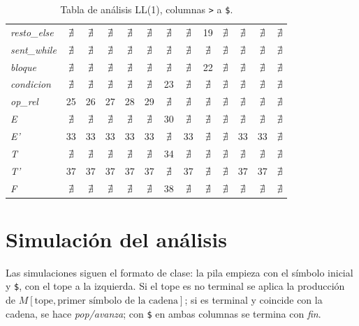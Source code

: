 \documentclass[12pt]{article}
\newcommand{\cmd}[1]{\texttt{\small #1}}
\newcommand{\nt}[1]{\textit{#1}}
\begin{document}
\begin{table}[p]
\begin{tabular}{@{}l*{12}{c}@{}}
\nt{resto\_else} & $\nexists$ & $\nexists$ & $\nexists$ & $\nexists$ & $\nexists$ & $\nexists$ & $\nexists$ & 19 & $\nexists$ & $\nexists$ & $\nexists$ & $\nexists$ \\
\nt{sent\_while} & $\nexists$ & $\nexists$ & $\nexists$ & $\nexists$ & $\nexists$ & $\nexists$ & $\nexists$ & $\nexists$ & $\nexists$ & $\nexists$ & $\nexists$ & $\nexists$ \\
\nt{bloque} & $\nexists$ & $\nexists$ & $\nexists$ & $\nexists$ & $\nexists$ & $\nexists$ & $\nexists$ & 22 & $\nexists$ & $\nexists$ & $\nexists$ & $\nexists$ \\
\nt{condicion} & $\nexists$ & $\nexists$ & $\nexists$ & $\nexists$ & $\nexists$ & 23 & $\nexists$ & $\nexists$ & $\nexists$ & $\nexists$ & $\nexists$ & $\nexists$ \\
\nt{op\_rel} & 25 & 26 & 27 & 28 & 29 & $\nexists$ & $\nexists$ & $\nexists$ & $\nexists$ & $\nexists$ & $\nexists$ & $\nexists$ \\
\nt{E} & $\nexists$ & $\nexists$ & $\nexists$ & $\nexists$ & $\nexists$ & 30 & $\nexists$ & $\nexists$ & $\nexists$ & $\nexists$ & $\nexists$ & $\nexists$ \\
\nt{E'} & 33 & 33 & 33 & 33 & 33 & $\nexists$ & 33 & $\nexists$ & $\nexists$ & 33 & 33 & $\nexists$ \\
\nt{T} & $\nexists$ & $\nexists$ & $\nexists$ & $\nexists$ & $\nexists$ & 34 & $\nexists$ & $\nexists$ & $\nexists$ & $\nexists$ & $\nexists$ & $\nexists$ \\
\nt{T'} & 37 & 37 & 37 & 37 & 37 & $\nexists$ & 37 & $\nexists$ & $\nexists$ & 37 & 37 & $\nexists$ \\
\nt{F} & $\nexists$ & $\nexists$ & $\nexists$ & $\nexists$ & $\nexists$ & 38 & $\nexists$ & $\nexists$ & $\nexists$ & $\nexists$ & $\nexists$ & $\nexists$ \\
\bottomrule
\end{tabular}
\caption{Tabla de análisis LL(1), columnas \texttt{>} a \texttt{\$}.}
\label{tab:matriz2}
\end{table}


\section{Simulación del análisis}
\label{sec:simulacion}

Las simulaciones siguen el formato de clase: la pila empieza con el símbolo inicial y
\cmd{\$}, con el tope a la izquierda. Si el tope es no terminal se aplica la producción de
$M[\text{tope}, \text{primer símbolo de la cadena}]$; si es terminal y coincide con la cadena, se
hace \emph{pop/avanza}; con \cmd{\$} en ambas columnas se termina con \emph{fin}.
\end{document}
